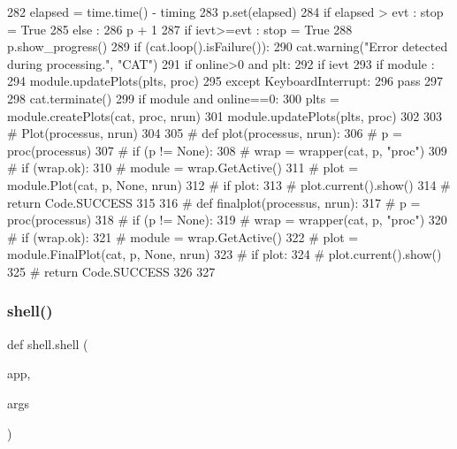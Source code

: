 \begin{DoxyCode}
282         elapsed = time.time() - timing
283         p.set(elapsed)
284         \textcolor{keywordflow}{if} elapsed > evt : stop = \textcolor{keyword}{True}
285       \textcolor{keywordflow}{else} :
286         p + 1
287         \textcolor{keywordflow}{if} ievt>=evt : stop = \textcolor{keyword}{True}
288       p.show\_progress()
289       \textcolor{keywordflow}{if} (cat.loop().isFailure()):
290         cat.warning(\textcolor{stringliteral}{"Error detected during processing."}, \textcolor{stringliteral}{"CAT"})
291       \textcolor{keywordflow}{if} online>0 \textcolor{keywordflow}{and} plt:
292         \textcolor{keywordflow}{if} ievt%
293           \textcolor{keywordflow}{if} module :
294             module.updatePlots(plts, proc)
295   \textcolor{keywordflow}{except} KeyboardInterrupt:
296     \textcolor{keywordflow}{pass}
297 
298   cat.terminate()
299   \textcolor{keywordflow}{if} module \textcolor{keywordflow}{and} online==0:
300     plts = module.createPlots(cat, proc, nrun) 
301     module.updatePlots(plts, proc)
302 
303   \textcolor{comment}{#  Plot(processus, nrun)}
304 
305 \textcolor{comment}{# def plot(processus, nrun):}
306 \textcolor{comment}{#   p = proc(processus)}
307 \textcolor{comment}{#   if (p != None):}
308 \textcolor{comment}{#     wrap = wrapper(cat, p, "proc")}
309 \textcolor{comment}{#     if (wrap.ok):}
310 \textcolor{comment}{#       module = wrap.GetActive()}
311 \textcolor{comment}{#       plot = module.Plot(cat, p, None, nrun)}
312 \textcolor{comment}{#       if plot:}
313 \textcolor{comment}{#         plot.current().show()}
314 \textcolor{comment}{#   return Code.SUCCESS}
315 
316 \textcolor{comment}{# def finalplot(processus, nrun):}
317 \textcolor{comment}{#   p = proc(processus)}
318 \textcolor{comment}{#   if (p != None):}
319 \textcolor{comment}{#     wrap = wrapper(cat, p, "proc")}
320 \textcolor{comment}{#     if (wrap.ok):}
321 \textcolor{comment}{#       module = wrap.GetActive()}
322 \textcolor{comment}{#       plot = module.FinalPlot(cat, p, None, nrun)}
323 \textcolor{comment}{#       if plot:}
324 \textcolor{comment}{#         plot.current().show()}
325 \textcolor{comment}{#   return Code.SUCCESS}
326 
327 
\end{DoxyCode}
\mbox{\label{namespaceshell_a95156c76dce36cfad6d1e2fcb85265ed}} 
\subsubsection{\texorpdfstring{shell()}{shell()}}
{\footnotesize\ttfamily def shell.\+shell (\begin{DoxyParamCaption}\item[{}]{app,  }\item[{}]{args }\end{DoxyParamCaption})}



